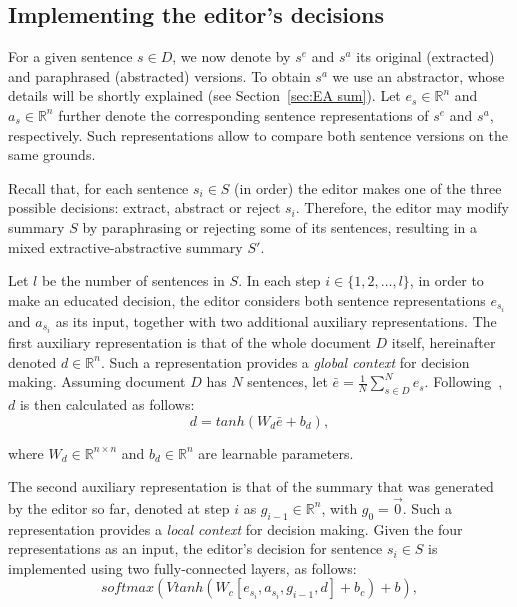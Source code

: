 \documentclass{article}
\begin{document}
\subsection{Implementing the editor's decisions}
For a given sentence $s\in{D}$, we now denote by $s^{e}$ and $s^{a}$ its original (extracted) and paraphrased (abstracted) versions.
To obtain $s^{a}$ we use an abstractor, whose details will be shortly explained (see Section~\ref{sec:EA sum}). Let $e_{s}\in\mathbb{R}^{n}$ and $a_{s}\in\mathbb{R}^{n}$ further denote the corresponding sentence representations of $s^{e}$ and $s^{a}$, respectively. Such representations allow to compare both sentence versions on the same grounds.

Recall that, for each sentence $s_{i}\in{S}$ (in order) the editor makes one of the three possible decisions: extract, abstract or reject $s_i$.
Therefore, the editor may modify summary $S$ by paraphrasing or rejecting some of its sentences, resulting in a mixed extractive-abstractive summary $S'$.

Let $l$ be the number of sentences in $S$. In each step $i\in\{1,2,\ldots,l\}$, in order to make an educated decision, the editor considers both sentence representations $e_{s_i}$ and $a_{s_i}$ as its input, together with two additional auxiliary representations. The first auxiliary representation is that of the whole document $D$ itself, hereinafter denoted $d\in\mathbb{R}^{n}$. Such a representation provides a \textit{global context} for decision making. Assuming document $D$ has $N$ sentences, let $\bar{e}=\frac{1}{N}\sum\limits_{s\in{D}}^{N}e_{s}$. Following~\cite{ChenFastAS2018,Wu2018LearningTE}, $d$ is then calculated as follows:
\begin{equation}\label{eq:doc rep}
  d=tanh\left(W_d\bar{e}+b_d\right),
\end{equation}

where $W_d\in\mathbb{R}^{n\times{n}}$ and $b_d\in\mathbb{R}^{n}$ are learnable parameters.

The second auxiliary representation is that of the summary that was generated by the editor so far, denoted at step $i$ as $g_{i-1}\in\mathbb{R}^{n}$, with $g_{0}=\vec{0}$. Such a representation provides a \textit{local context} for decision making. Given the four representations as an input, the editor's decision for sentence $s_{i}\in{S}$ is implemented using two fully-connected layers, as follows:
\begin{equation}\label{eq:action likelihood}
  softmax\left(Vtanh\left(W_c[e_{s_i},a_{s_i},g_{i-1},d]+b_c\right)+b\right),
\end{equation}
\end{document}
